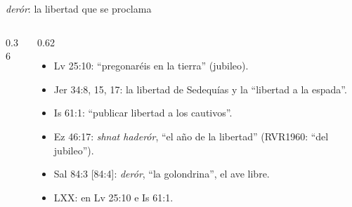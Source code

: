 \begin{frame}{ \emph{derór}: la libertad que se proclama}
\begin{columns}[c,onlytextwidth]
\begin{column}{0.36\textwidth}
\centering
{}
\end{column}
\begin{column}{0.62\textwidth}\small
\begin{itemize}
\item Lv 25:10: ``pregonaréis  en la tierra'' (jubileo).
\item Jer 34:8, 15, 17: la libertad de Sedequías y la ``libertad a la espada''.
\item Is 61:1: ``publicar libertad a los cautivos''.
\item Ez 46:17: \emph{shnat haderór}, ``el año de la libertad'' (RVR1960: ``del jubileo'').
\item Sal 84:3 [84:4]: \emph{derór}, ``la golondrina'', el ave libre.
\item LXX:  en Lv 25:10 e Is 61:1.
\end{itemize}
\end{column}
\end{columns}
\end{frame}

